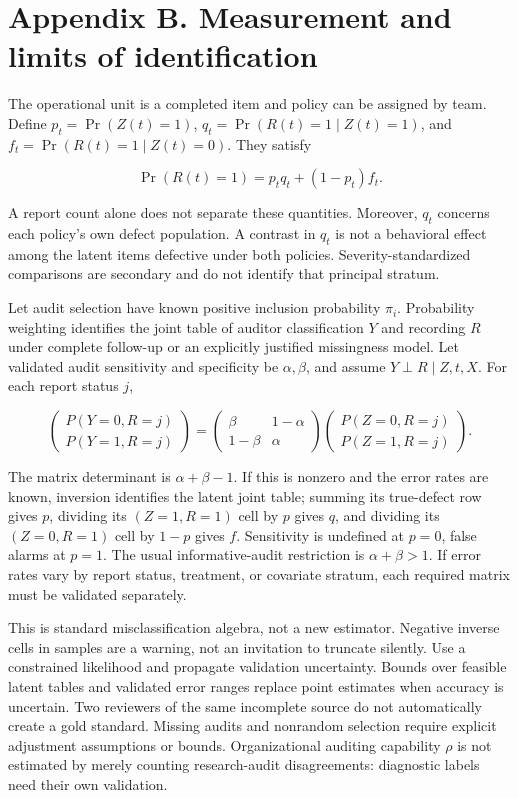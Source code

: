 \documentclass[
  11pt,
]{article}
\begin{document}
\section{Appendix B. Measurement and limits of
identification}\label{appendix-b.-measurement-and-limits-of-identification}

The operational unit is a completed item and policy can be assigned by
team. Define \(p_t=\Pr(Z(t)=1)\), \(q_t=\Pr(R(t)=1\mid Z(t)=1)\), and
\(f_t=\Pr(R(t)=1\mid Z(t)=0)\). They satisfy

\[\Pr(R(t)=1)=p_tq_t+(1-p_t)f_t.\]

A report count alone does not separate these quantities. Moreover,
\(q_t\) concerns each policy's own defect population. A contrast in
\(q_t\) is not a behavioral effect among the latent items defective
under both policies. Severity-standardized comparisons are secondary and
do not identify that principal stratum.

Let audit selection have known positive inclusion probability \(\pi_i\).
Probability weighting identifies the joint table of auditor
classification \(Y\) and recording \(R\) under complete follow-up or an
explicitly justified missingness model. Let validated audit sensitivity
and specificity be \(\alpha,\beta\), and assume \(Y\perp R\mid Z,t,X\).
For each report status \(j\),

\[\begin{pmatrix}P(Y=0,R=j)\\P(Y=1,R=j)\end{pmatrix}
=\begin{pmatrix}\beta&1-\alpha\\1-\beta&\alpha\end{pmatrix}
\begin{pmatrix}P(Z=0,R=j)\\P(Z=1,R=j)\end{pmatrix}. \tag{B1}\]

The matrix determinant is \(\alpha+\beta-1\). If this is nonzero and the
error rates are known, inversion identifies the latent joint table;
summing its true-defect row gives \(p\), dividing its \((Z=1,R=1)\) cell
by \(p\) gives \(q\), and dividing its \((Z=0,R=1)\) cell by \(1-p\)
gives \(f\). Sensitivity is undefined at \(p=0\), false alarms at
\(p=1\). The usual informative-audit restriction is \(\alpha+\beta>1\).
If error rates vary by report status, treatment, or covariate stratum,
each required matrix must be validated separately.

This is standard misclassification algebra, not a new estimator.
Negative inverse cells in samples are a warning, not an invitation to
truncate silently. Use a constrained likelihood and propagate validation
uncertainty. Bounds over feasible latent tables and validated error
ranges replace point estimates when accuracy is uncertain. Two reviewers
of the same incomplete source do not automatically create a gold
standard. Missing audits and nonrandom selection require explicit
adjustment assumptions or bounds. Organizational auditing capability
\(\rho\) is not estimated by merely counting research-audit
disagreements: diagnostic labels need their own validation.
\end{document}
